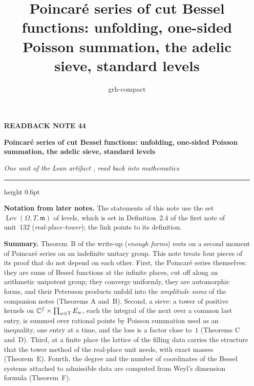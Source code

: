 \documentclass[11pt,a4paper]{article}
\title{Poincaré series of cut Bessel functions: unfolding, one-sided Poisson summation, the adelic sieve, standard levels}
\author{grh-compact}
\date{}
\theoremstyle{plainx}
\theoremstyle{uprightx}
\newcommand{\Levels}[3]{\operatorname{Lev}(#1,#2,#3)} %
\begin{document}
\color{ink}

{\raggedright
{\sffamily\bfseries\fontsize{7.2}{9}\selectfont\color{leancol}READBACK NOTE 44\par}
\vspace{5pt}
{\fontsize{21.5}{25.5}\selectfont\bfseries Poincar\'e series of cut Bessel functions: unfolding, one-sided Poisson
summation, the adelic sieve, standard levels\par}
\vspace{5pt}
{\fontsize{12.4}{16}\selectfont\itshape\color{inksoft} One unit of the Lean artifact \ArtifactName, read back into
mathematics\par}}
\vspace{8pt}
{\color{rulegrey}\hrule height 0.6pt}
\vspace{7pt}
\thispagestyle{empty}
\providecommand{\notelink}[3]{\href{https://nasqret.github.io/riemann-rev/writeup/browse/notes/#1.pdf\#nameddest=#2}{#3}}

\textbf{Notation from later notes.} The statements of this note use the set
\notelink{real-place-tower}{theorem.2.4}{$\Levels{\Omega}{T}{\mathfrak{m}}$} of levels, which is set in Definition~2.4 of
the first note of unit~132 (\emph{real-place-tower}); the link points to its definition.


\textbf{Summary.} Theorem~B of the write-up (\emph{enough forms}) rests on a second moment of Poincar\'e series on an
indefinite unitary group. This note treats four pieces of its proof that do not depend on each other. First, the
Poincar\'e series themselves: they are sums of Bessel functions at the infinite places, cut off along an arithmetic
unipotent group; they converge uniformly, they are automorphic forms, and their Petersson products unfold into the
\emph{amplitude sums} of the companion notes (Theorems A and~B). Second, a sieve: a tower of positive kernels on
$\mathbb{C}^{f}\times\prod_{w\in\mathsf{T}}E_w$, each the integral of the next over a common last entry, is summed over rational
points by Poisson summation used as an inequality, one entry at a time, and the loss is a factor close to~$1$
(Theorems C and~D). Third, at a finite place the lattice of the filling data carries the structure that the tower
method of the real-place unit needs, with exact masses (Theorem~E). Fourth, the degree and the number of coordinates
of the Bessel systems attached to admissible data are computed from Weyl's dimension formula (Theorem~F).
\end{document}
